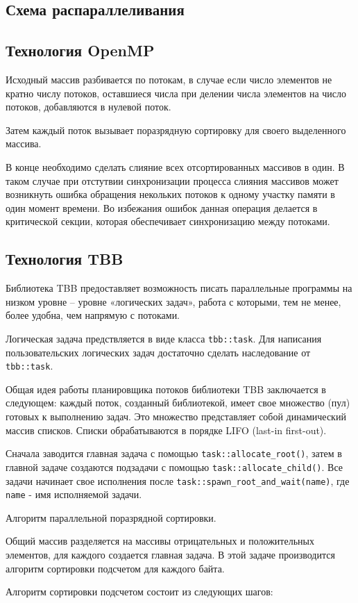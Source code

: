 \documentclass{report}
\begin{document}
\newpage

\begin{center}\section*{Схема распараллеливания}\end{center}
\subsection*{Технология OpenMP}
\par Исходный массив разбивается по потокам, в случае если число элементов не кратно числу потоков, оставшиеся числа при делении числа элементов на число потоков, добавляются в нулевой поток.
\par Затем каждый поток вызывает поразрядную сортировку для своего выделенного массива.
\par В конце необходимо сделать слияние всех отсортированных массивов в один. В таком случае при отстутвии синхронизации процесса слияния массивов может возникнуть ошибка обращения некольких потоков к одному участку памяти в один момент времени. Во избежания ошибок данная операция делается в критической секции, которая обеспечивает синхронизацию между потоками.

\subsection*{Технология TBB}
\par  Библиотека TBB предоставляет возможность писать параллельные программы на низком уровне – уровне «логических задач», работа с которыми, тем не менее, более удобна, чем напрямую с потоками.
\par Логическая задача предствляется в виде класса \verb|tbb::task|. Для написания пользовательских логических задач достаточно сделать наследование от \verb|tbb::task|.
\par Общая идея работы планировщика потоков библиотеки TBB заключается в следующем: каждый поток, созданный библиотекой, имеет свое множество (пул) готовых к выполнению задач. Это множество представляет собой динамический массив списков. Списки обрабатываются в порядке LIFO (last-in first-out).
\par Сначала заводится главная задача с помощью \verb|task::allocate_root()|, затем в главной задаче создаются подзадачи с помощью \verb|task::allocate_child()|. Все задачи начинает свое исполнения после \verb|task::spawn_root_and_wait(name)|, где \verb|name| - имя исполняемой задачи.
\par Алгоритм параллельной поразрядной сортировки.
\par Общий массив разделяется на массивы отрицательных и положительных элементов, для каждого создается главная задача. В этой задаче производится алгоритм сортировки подсчетом для каждого байта.
\par Алгоритм сортировки подсчетом состоит из следующих шагов:
\end{document}
